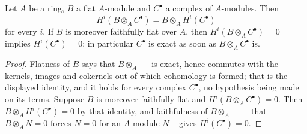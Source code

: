 \begin{lemma}
\label{lem:pc-ff-detects-exactness}
Let $A$ be a ring, $B$ a flat $A$-module and $C^\bullet$ a complex of
$A$-modules.  Then
\[
H^i(B\otimes_AC^\bullet)=B\otimes_AH^i(C^\bullet)
\]
for every $i$.  If $B$ is moreover faithfully flat over $A$, then
$H^i(B\otimes_AC^\bullet)=0$ implies $H^i(C^\bullet)=0$; in particular
$C^\bullet$ is exact as soon as $B\otimes_AC^\bullet$ is.
\end{lemma}
\begin{proof}
Flatness of $B$ says that $B\otimes_A-$ is exact, hence commutes with
the kernels, images and cokernels out of which cohomology is formed;
that is the displayed identity, and it holds for every complex
$C^\bullet$, no hypothesis being made on its terms.  Suppose $B$ is
moreover faithfully flat and $H^i(B\otimes_AC^\bullet)=0$.  Then
$B\otimes_AH^i(C^\bullet)=0$ by that identity, and faithfulness of
$B\otimes_A-$ -- that $B\otimes_AN=0$ forces $N=0$ for an $A$-module
$N$ -- gives $H^i(C^\bullet)=0$.
\end{proof}

